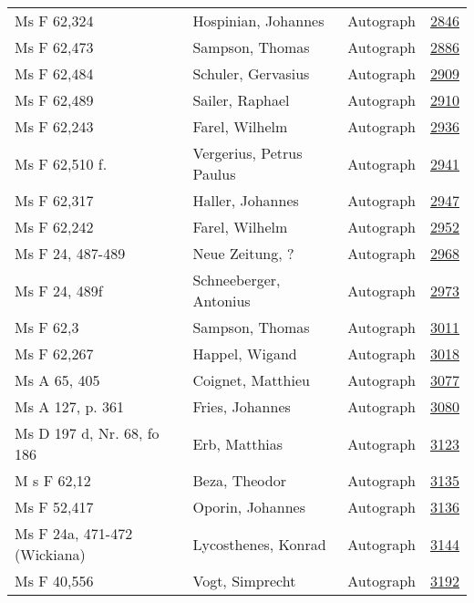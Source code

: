 \documentclass[10pt,a4paper,landscape]{report}
\begin{document}
\begin{longtable}{p{16cm}p{4cm}lr}
Ms F 62,324	&	Hospinian, Johannes	&	Autograph	&	\href{http://130.60.24.72/assignment/2846}{2846}\\
Ms F 62,473	&	Sampson, Thomas	&	Autograph	&	\href{http://130.60.24.72/assignment/2886}{2886}\\
Ms F 62,484	&	Schuler, Gervasius	&	Autograph	&	\href{http://130.60.24.72/assignment/2909}{2909}\\
Ms F 62,489	&	Sailer, Raphael	&	Autograph	&	\href{http://130.60.24.72/assignment/2910}{2910}\\
Ms F 62,243	&	Farel, Wilhelm	&	Autograph	&	\href{http://130.60.24.72/assignment/2936}{2936}\\
Ms F 62,510 f.	&	Vergerius, Petrus Paulus	&	Autograph	&	\href{http://130.60.24.72/assignment/2941}{2941}\\
Ms F 62,317	&	Haller, Johannes	&	Autograph	&	\href{http://130.60.24.72/assignment/2947}{2947}\\
Ms F 62,242	&	Farel, Wilhelm	&	Autograph	&	\href{http://130.60.24.72/assignment/2952}{2952}\\
Ms F 24, 487-489	&	Neue Zeitung, ?	&	Autograph	&	\href{http://130.60.24.72/assignment/2968}{2968}\\
Ms F 24, 489f	&	Schneeberger, Antonius	&	Autograph	&	\href{http://130.60.24.72/assignment/2973}{2973}\\
Ms F 62,3	&	Sampson, Thomas	&	Autograph	&	\href{http://130.60.24.72/assignment/3011}{3011}\\
Ms F 62,267	&	Happel, Wigand	&	Autograph	&	\href{http://130.60.24.72/assignment/3018}{3018}\\
Ms A 65, 405	&	Coignet, Matthieu	&	Autograph	&	\href{http://130.60.24.72/assignment/3077}{3077}\\
Ms A 127, p. 361	&	Fries, Johannes	&	Autograph	&	\href{http://130.60.24.72/assignment/3080}{3080}\\
Ms D 197 d, Nr. 68, fo 186	&	Erb, Matthias	&	Autograph	&	\href{http://130.60.24.72/assignment/3123}{3123}\\
M s F 62,12	&	Beza, Theodor	&	Autograph	&	\href{http://130.60.24.72/assignment/3135}{3135}\\
Ms F 52,417	&	Oporin, Johannes	&	Autograph	&	\href{http://130.60.24.72/assignment/3136}{3136}\\
Ms F 24a, 471-472 (Wickiana)	&	Lycosthenes, Konrad	&	Autograph	&	\href{http://130.60.24.72/assignment/3144}{3144}\\
Ms F 40,556	&	Vogt, Simprecht	&	Autograph	&	\href{http://130.60.24.72/assignment/3192}{3192}\\

\end{longtable}
\end{document}
